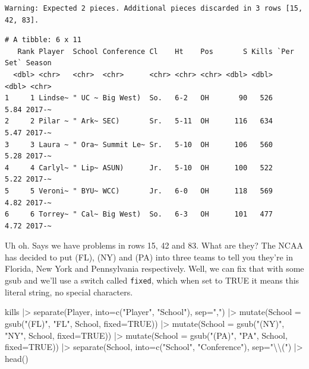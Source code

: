 \documentclass[
  letterpaper,
  DIV=11,
  numbers=noendperiod]{scrreprt}
\newenvironment{Shaded}{\begin{snugshade}}{\end{snugshade}}
\newcommand{\AttributeTok}[1]{\textcolor[rgb]{0.40,0.45,0.13}{#1}}
\newcommand{\ConstantTok}[1]{\textcolor[rgb]{0.56,0.35,0.01}{#1}}
\newcommand{\FunctionTok}[1]{\textcolor[rgb]{0.28,0.35,0.67}{#1}}
\newcommand{\NormalTok}[1]{\textcolor[rgb]{0.00,0.23,0.31}{#1}}
\newcommand{\SpecialCharTok}[1]{\textcolor[rgb]{0.37,0.37,0.37}{#1}}
\newcommand{\StringTok}[1]{\textcolor[rgb]{0.13,0.47,0.30}{#1}}
\begin{document}
\begin{verbatim}
Warning: Expected 2 pieces. Additional pieces discarded in 3 rows [15, 42, 83].
\end{verbatim}

\begin{verbatim}
# A tibble: 6 x 11
   Rank Player  School Conference Cl    Ht    Pos       S Kills `Per Set` Season
  <dbl> <chr>   <chr>  <chr>      <chr> <chr> <chr> <dbl> <dbl>     <dbl> <chr> 
1     1 Lindse~ " UC ~ Big West)  So.   6-2   OH       90   526      5.84 2017-~
2     2 Pilar ~ " Ark~ SEC)       Sr.   5-11  OH      116   634      5.47 2017-~
3     3 Laura ~ " Ora~ Summit Le~ Sr.   5-10  OH      106   560      5.28 2017-~
4     4 Carlyl~ " Lip~ ASUN)      Jr.   5-10  OH      100   522      5.22 2017-~
5     5 Veroni~ " BYU~ WCC)       Jr.   6-0   OH      118   569      4.82 2017-~
6     6 Torrey~ " Cal~ Big West)  So.   6-3   OH      101   477      4.72 2017-~
\end{verbatim}

Uh oh. Says we have problems in rows 15, 42 and 83. What are they? The
NCAA has decided to put (FL), (NY) and (PA) into three teams to tell you
they're in Florida, New York and Pennsylvania respectively. Well, we can
fix that with some gsub and we'll use a switch called \texttt{fixed},
which when set to TRUE it means this literal string, no special
characters.

\begin{Shaded}
\begin{Highlighting}[]
\NormalTok{kills }\SpecialCharTok{|\textgreater{}} 
  \FunctionTok{separate}\NormalTok{(Player, }\AttributeTok{into=}\FunctionTok{c}\NormalTok{(}\StringTok{"Player"}\NormalTok{, }\StringTok{"School"}\NormalTok{), }\AttributeTok{sep=}\StringTok{","}\NormalTok{) }\SpecialCharTok{|\textgreater{}} 
  \FunctionTok{mutate}\NormalTok{(}\AttributeTok{School =} \FunctionTok{gsub}\NormalTok{(}\StringTok{"(FL)"}\NormalTok{, }\StringTok{"FL"}\NormalTok{, School, }\AttributeTok{fixed=}\ConstantTok{TRUE}\NormalTok{)) }\SpecialCharTok{|\textgreater{}}
  \FunctionTok{mutate}\NormalTok{(}\AttributeTok{School =} \FunctionTok{gsub}\NormalTok{(}\StringTok{"(NY)"}\NormalTok{, }\StringTok{"NY"}\NormalTok{, School, }\AttributeTok{fixed=}\ConstantTok{TRUE}\NormalTok{)) }\SpecialCharTok{|\textgreater{}}
  \FunctionTok{mutate}\NormalTok{(}\AttributeTok{School =} \FunctionTok{gsub}\NormalTok{(}\StringTok{"(PA)"}\NormalTok{, }\StringTok{"PA"}\NormalTok{, School, }\AttributeTok{fixed=}\ConstantTok{TRUE}\NormalTok{)) }\SpecialCharTok{|\textgreater{}}
  \FunctionTok{separate}\NormalTok{(School, }\AttributeTok{into=}\FunctionTok{c}\NormalTok{(}\StringTok{"School"}\NormalTok{, }\StringTok{"Conference"}\NormalTok{), }\AttributeTok{sep=}\StringTok{"}\SpecialCharTok{\textbackslash{}\textbackslash{}}\StringTok{("}\NormalTok{) }\SpecialCharTok{|\textgreater{}} 
  \FunctionTok{head}\NormalTok{()}
\end{Highlighting}
\end{Shaded}
\end{document}
